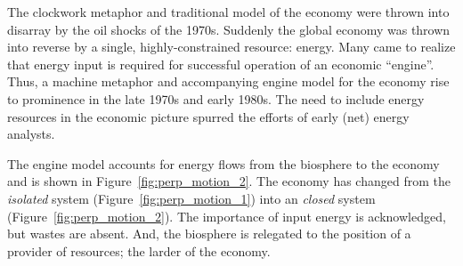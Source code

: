 %
%


The clockwork metaphor and traditional model of the economy were 
thrown into disarray by the oil
shocks of the 1970s.
Suddenly the global economy was thrown
into reverse by a single, highly-constrained resource: energy.
Many came to realize that energy input is required
for successful operation of an economic ``engine''.
Thus, a machine metaphor and accompanying engine model for the economy 
rise to prominence
in the late 1970s and early 1980s.
The need to include energy resources
in the economic picture
spurred the efforts of early (net) energy 
analysts.\cite{Gilliland1975, Chapman1976}

The engine model accounts for energy flows from the biosphere 
to the economy and is shown in Figure~\ref{fig:perp_motion_2}.
The economy has changed from the \emph{isolated}
system (Figure~\ref{fig:perp_motion_1}) into an \emph{closed} system
(Figure~\ref{fig:perp_motion_2}). 
The importance of input energy is acknowledged, 
but wastes are absent.
And, the biosphere is relegated to the position
of a provider of resources;
the larder of the economy.\cite{Norgaard2010}

